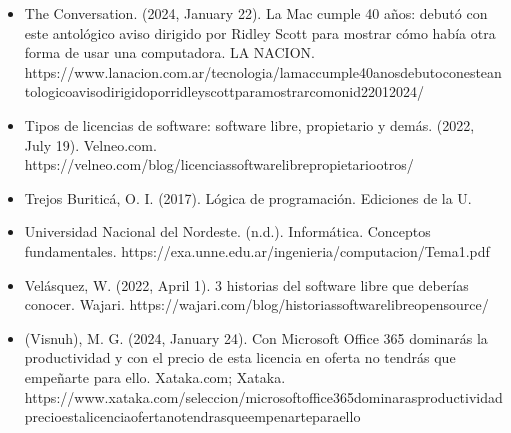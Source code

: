 \documentclass[letterpaper,10pt,spanish]{sphinxmanual}
\begin{document}
\begin{itemize}
\item {} 
\sphinxAtStartPar
The Conversation. (2024, January 22). La Mac cumple 40 años: debutó con este antológico aviso dirigido por Ridley Scott para mostrar cómo había otra forma de usar una computadora. LA NACION. https://www.lanacion.com.ar/tecnologia/la\sphinxhyphen{}mac\sphinxhyphen{}cumple\sphinxhyphen{}40\sphinxhyphen{}anos\sphinxhyphen{}debuto\sphinxhyphen{}con\sphinxhyphen{}este\sphinxhyphen{}antologico\sphinxhyphen{}aviso\sphinxhyphen{}dirigido\sphinxhyphen{}por\sphinxhyphen{}ridley\sphinxhyphen{}scott\sphinxhyphen{}para\sphinxhyphen{}mostrar\sphinxhyphen{}como\sphinxhyphen{}nid22012024/

\item {} 
\sphinxAtStartPar
Tipos de licencias de software: software libre, propietario y demás. (2022, July 19). Velneo.com. https://velneo.com/blog/licencias\sphinxhyphen{}software\sphinxhyphen{}libre\sphinxhyphen{}propietario\sphinxhyphen{}otros/

\item {} 
\sphinxAtStartPar
Trejos Buriticá, O. I. (2017). Lógica de programación. Ediciones de la U.

\item {} 
\sphinxAtStartPar
Universidad Nacional del Nordeste. (n.d.). Informática. Conceptos fundamentales. https://exa.unne.edu.ar/ingenieria/computacion/Tema1.pdf

\item {} 
\sphinxAtStartPar
Velásquez, W. (2022, April 1). 3 historias del software libre que deberías conocer. Wajari. https://wajari.com/blog/historias\sphinxhyphen{}software\sphinxhyphen{}libre\sphinxhyphen{}open\sphinxhyphen{}source/

\item {} 
\sphinxAtStartPar
(Visnuh), M. G. (2024, January 24). Con Microsoft Office 365 dominarás la productividad y con el precio de esta licencia en oferta no tendrás que empeñarte para ello. Xataka.com; Xataka. https://www.xataka.com/seleccion/microsoft\sphinxhyphen{}office\sphinxhyphen{}365\sphinxhyphen{}dominaras\sphinxhyphen{}productividad\sphinxhyphen{}precio\sphinxhyphen{}esta\sphinxhyphen{}licencia\sphinxhyphen{}oferta\sphinxhyphen{}no\sphinxhyphen{}tendras\sphinxhyphen{}que\sphinxhyphen{}empenarte\sphinxhyphen{}para\sphinxhyphen{}ello

\end{itemize}

\sphinxstepscope
\end{document}

